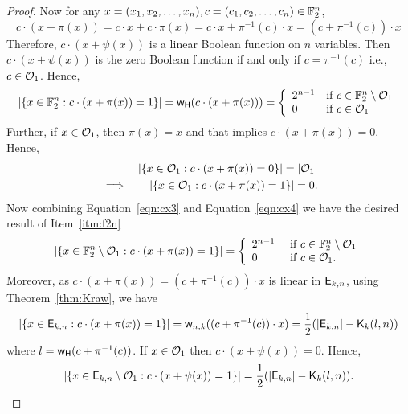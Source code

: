 \documentclass{llncs}
\begin{document}
\begin{proof}
Now for any $x = (x_1, x_2, \ldots, x_n), c = (c_1, c_2, \ldots, c_n) \in \mathbb{F}_2^n$,
\begin{equation}\label{eqn:cx2}
c \cdot (x+\pi(x)) = c \cdot x + c \cdot \pi(x) = c \cdot x + \pi^{-1}(c) \cdot x  =  (c+\pi^{-1}(c)) \cdot x 
\end{equation}
Therefore, $c \cdot (x+\psi(x))$ is a linear Boolean function on $n$ variables. Then $c \cdot (x+\psi(x))$ is the zero Boolean function if and only if $c  = \pi^{-1}(c)$ i.e., $c \in \mathcal{O}_1$.
Hence,
\begin{equation}\label{eqn:cx3}
|\{x \in \mathbb{F}_2^n : c \cdot (x + \pi(x))= 1\}| = \mathsf{w_H}(c \cdot (x+\pi(x))) 
= \left\{ \begin{array}{ll}
2^{n-1} & \text{if } c \in \mathbb{F}_2^n \setminus \mathcal{O}_1 \\
0 & \text{if } c \in \mathcal{O}_1
\end{array} \right.
\end{equation}
Further, if $x \in \mathcal{O}_1$, then $\pi(x) = x$ and that implies $c \cdot (x+\pi(x)) = 0$. Hence,
\begin{eqnarray}\label{eqn:cx4}
&& |\{x \in \mathcal{O}_1 : c \cdot (x + \pi(x))= 0\}| = |\mathcal{O}_1|\nonumber \\
&\implies & |\{x \in \mathcal{O}_1 : c \cdot (x + \pi(x))= 1\}| = 0.
\end{eqnarray}
Now combining Equation~\ref{eqn:cx3} and Equation~\ref{eqn:cx4} we have the desired result of Item~\ref{itm:f2n}
$$|\{x \in \mathbb{F}_2^n \setminus \mathcal{O}_1 : c \cdot (x + \pi(x))= 1\}| 
= \left \{ \begin{array}{ll}
2^{n-1}  &  \text{ if } c \in \mathbb{F}_2^n \setminus \mathcal{O}_1  \\
0              &  \text{ if } c \in \mathcal{O}_1.
\end{array} \right.$$
Moreover, as $c \cdot (x+\pi(x)) = (c+\pi^{-1}(c)) \cdot x$ is linear in $\mathsf{E}_{k,n}$, using Theorem~\ref{thm:Kraw}, we have
$$\left| \{x \in \mathsf{E}_{k,n} : c \cdot (x + \pi(x))= 1\} \right| = \mathsf{w}_{n,k}((c+\pi^{-1}(c)) \cdot x) = \frac{1}{2} (|\mathsf{E}_{k,n}| - \mathsf{K}_{k}(l,n))$$
where $l = \mathsf{w_H}(c+\pi^{-1}(c))$. 
If $x \in \mathcal{O}_1$ then $c \cdot (x+\psi(x)) = 0$. Hence,
$$\left| \{x \in \mathsf{E}_{k,n} \setminus \mathcal{O}_1 : c \cdot (x + \psi(x))= 1\} \right| 
= \frac{1}{2} (|\mathsf{E}_{k,n}| - \mathsf{K}_{k}(l,n)).$$
\end{proof} 
\end{document}
